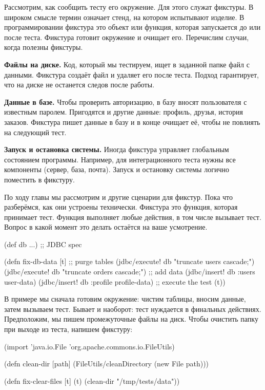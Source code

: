 Рассмотрим, как сообщить тесту его окружение. Для этого служат фикстуры. В
широком смысле термин означает стенд, на котором испытывают изделие. В
программировании фикстура это объект или функция, которая запускается до или
после теста. Фикстура готовит окружение и очищает его. Перечислим случаи, когда
полезны фикстуры.


\textbf{Файлы на диске.} Код, который мы тестируем, ищет в заданной папке файл с
данными. Фикстура создаёт файл и удаляет его после теста. Подход гарантирует,
что на диске не останется следов после работы.

\textbf{Данные в базе.} Чтобы проверить авторизацию, в базу вносят пользователя
с известным паролем. Пригодятся и другие данные: профиль, друзья, история
заказов. Фикстура пишет данные в базу и в конце очищает её, чтобы не повлиять на
следующий тест.

\textbf{Запуск и остановка системы.} Иногда фикстура управляет глобальным
состоянием программы. Например, для интеграционного теста нужны все компоненты
(сервер, база, почта). Запуск и остановку системы логично поместить в фикстуру.

По ходу главы мы рассмотрим и другие сценарии для фикстур. Пока что разберёмся,
как они устроены технически. Фикстура это функция, которая принимает
тест. Функция выполняет любые действия, в том числе вызывает тест. Вопрос в
какой момент это делать остаётся на ваше усмотрение.


\begin{english}
  \begin{clojure}
(def db {...}) ;; JDBC spec

(defn fix-db-data [t]
  ;; purge tables
  (jdbc/execute! db "truncate users cascade;")
  (jdbc/execute! db "truncate orders cascade;")
  ;; add data
  (jdbc/insert! db :users user-data)
  (jdbc/insert! db :profile profile-data)
  ;; execute the test
  (t))
  \end{clojure}
\end{english}

В примере мы сначала готовим окружение: чистим таблицы, вносим данные, затем
вызываем тест. Бывает и наоборот: тест нуждается в финальных
действиях. Предположим, мы пишем промежуточные файлы на диск. Чтобы очистить
папку при выходе из теста, напишем фикстуру:


\begin{english}
  \begin{clojure}
(import 'java.io.File
        'org.apache.commons.io.FileUtils)

(defn clean-dir [path]
  (FileUtils/cleanDirectory (new File path)))

(defn fix-clear-files [t]
  (t)
  (clean-dir "/tmp/tests/data"))
  \end{clojure}
\end{english}

